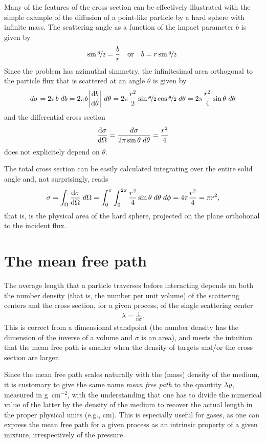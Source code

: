 Many of the features of the cross section can be effectively illustrated with the
simple example of the diffusion of a point-like particle by a hard sphere with
infinite mass. The scattering angle as a function of the impact parameter $b$
is given by
\begin{align*}
  \sin\nicefrac{\theta}{2} = \frac{b}{r}
  \quad\text{or}\quad
  b = r \sin\nicefrac{\theta}{2}.
\end{align*}
Since the problem has azimuthal simmetry, the infinitesimal area orthogonal to
the particle flux that is scattered at an angle $\theta$ is given by
\begin{align*}
  d\sigma = 2\pi b \;d{b} = 2\pi b \abs{\dv{b}{\theta}} \;d{\theta} =
  2\pi \frac{r^2}{2} \sin\nicefrac{\theta}{2}\cos\nicefrac{\theta}{2}\;d{\theta} =
  2\pi \frac{r^2}{4} \sin\theta \;d{\theta}
\end{align*}
and the differential cross section
\begin{align}
  \dv{\sigma}{\Omega} = \frac{d\sigma}{2\pi \sin\theta \;d{\theta}} = \frac{r^2}{4}
\end{align}
does not explicitely depend on $\theta$.

The total cross section can be easily calculated integrating over the entire
solid angle and, not surprisingly, reads
\begin{align}
  \sigma = \int_\Omega \dv{\sigma}{\Omega} \;d{\Omega} =
  \int_0^\pi \int_0^{2\pi} \frac{r^2}{4} \sin\theta \;d{\theta} \;d{\phi} =
  4 \pi \frac{r^2}{4} = \pi r^2,
\end{align}
that is, is the physical area of the hard sphere, projected on the plane orthohonal
to the incident flux.


\section{The mean free path}

The average length that a particle traverses before interacting depends on both
the number density (that is, the number per unit volume) of the scattering centers
and the cross section, for a given process, of the single scattering center
\begin{align}
  \lambda = \frac{1}{n \sigma}.
\end{align}
This is correct from a dimensional standpoint (the number density has the dimension
of the inverse of a volume and $\sigma$ is an area), and meets the intuition that
the mean free path is smaller when the density of targets and/or the cross section
are larger.

Since the mean free path scales naturally with the (mass) density of the medium,
it is customary to give the same name \emph{mean free path} to the quantity
$\lambda \varrho$, measured in g~cm$^{-2}$, with the understanding that one has
to divide the numerical value of the latter by the density of the medium to recover
the actual length in the proper physical units (e.g., cm). This is especially useful
for gases, as one can express the mean free path for a given process as an
intrinsic property of a given mixture, irrespectively of the pressure.


